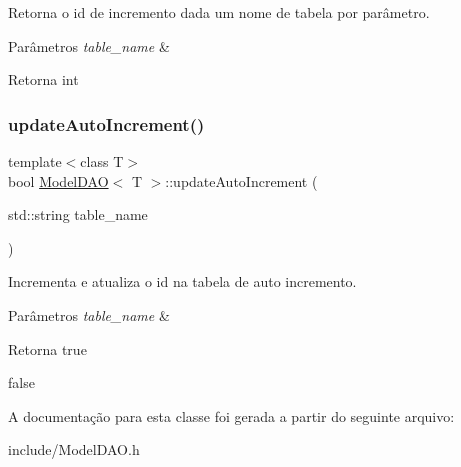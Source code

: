Retorna o id de incremento dada um nome de tabela por parâmetro. 


\begin{DoxyParams}{Parâmetros}
{\em table\+\_\+name} & \\
\hline
\end{DoxyParams}
\begin{DoxyReturn}{Retorna}
int 
\end{DoxyReturn}
\mbox{\label{classModelDAO_af524ba9765af94ca633587d3ecf8964b}} 
\subsubsection{\texorpdfstring{update\+Auto\+Increment()}{updateAutoIncrement()}}
{\footnotesize\ttfamily template$<$class T$>$ \\
bool \hyperlink{classModelDAO}{Model\+D\+AO}$<$ T $>$\+::update\+Auto\+Increment (\begin{DoxyParamCaption}\item[{std\+::string}]{table\+\_\+name }\end{DoxyParamCaption})\hspace{0.3cm}{\ttfamily [inline]}}



Incrementa e atualiza o id na tabela de auto incremento. 


\begin{DoxyParams}{Parâmetros}
{\em table\+\_\+name} & \\
\hline
\end{DoxyParams}
\begin{DoxyReturn}{Retorna}
true 

false 
\end{DoxyReturn}


A documentação para esta classe foi gerada a partir do seguinte arquivo\+:\begin{DoxyCompactItemize}
\item 
include/Model\+D\+A\+O.\+h\end{DoxyCompactItemize}
